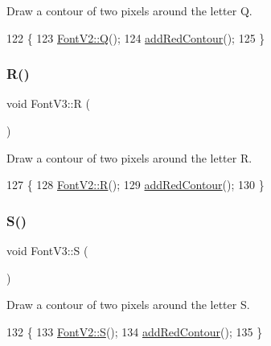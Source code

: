 Draw a contour of two pixels around the letter Q. 


\begin{DoxyCode}
122                \{
123     \mbox{\hyperlink{class_font_v2_af8e979a962becf153ecc82051ad2c8fc}{FontV2::Q}}();
124     \mbox{\hyperlink{class_font_v3_a639f1eac0eb6724463813270f47e2696}{addRedContour}}();
125 \}
\end{DoxyCode}
\mbox{\label{class_font_v3_abc320973012fd3dec227e60c2269d338}} 
\subsubsection{\texorpdfstring{R()}{R()}}
{\footnotesize\ttfamily void Font\+V3\+::R (\begin{DoxyParamCaption}{ }\end{DoxyParamCaption})}



Draw a contour of two pixels around the letter R. 


\begin{DoxyCode}
127                \{
128     \mbox{\hyperlink{class_font_v2_a852e482795dc7557137419b713711774}{FontV2::R}}();
129     \mbox{\hyperlink{class_font_v3_a639f1eac0eb6724463813270f47e2696}{addRedContour}}();
130 \}
\end{DoxyCode}
\mbox{\label{class_font_v3_a522d4f1c025929b406fc4be2659c6545}} 
\subsubsection{\texorpdfstring{S()}{S()}}
{\footnotesize\ttfamily void Font\+V3\+::S (\begin{DoxyParamCaption}{ }\end{DoxyParamCaption})}



Draw a contour of two pixels around the letter S. 


\begin{DoxyCode}
132                \{
133     \mbox{\hyperlink{class_font_v2_adcccd6f866d51bb27568d8c4c465551f}{FontV2::S}}();
134     \mbox{\hyperlink{class_font_v3_a639f1eac0eb6724463813270f47e2696}{addRedContour}}();
135 \}
\end{DoxyCode}
\mbox{\label{class_font_v3_ac1e011dfdcf4321ea84968929c777d2a}} 
